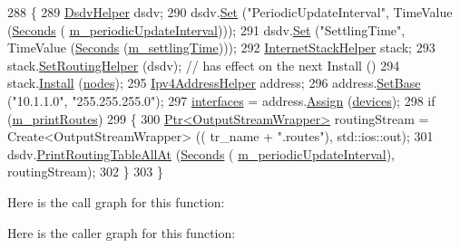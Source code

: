 \begin{DoxyCode}
288 \{
289   \hyperlink{classns3_1_1DsdvHelper}{DsdvHelper} dsdv;
290   dsdv.\hyperlink{classns3_1_1DsdvHelper_a782571eeded1e3e5978f4b430cd2bc2f}{Set} (\textcolor{stringliteral}{"PeriodicUpdateInterval"}, TimeValue (\hyperlink{group__timecivil_ga33c34b816f8ff6628e33d5c8e9713b9e}{Seconds} (
      \hyperlink{classDsdvManetExample_af850aea141a571eb01896a3b7f36d7d2}{m\_periodicUpdateInterval})));
291   dsdv.\hyperlink{classns3_1_1DsdvHelper_a782571eeded1e3e5978f4b430cd2bc2f}{Set} (\textcolor{stringliteral}{"SettlingTime"}, TimeValue (\hyperlink{group__timecivil_ga33c34b816f8ff6628e33d5c8e9713b9e}{Seconds} (\hyperlink{classDsdvManetExample_aaa43812d7f08d1d314ca3efdcc3d24e2}{m\_settlingTime})));
292   \hyperlink{classns3_1_1InternetStackHelper}{InternetStackHelper} stack;
293   stack.\hyperlink{classns3_1_1InternetStackHelper_a3e382c02df022dec79952a7eca8cd5ba}{SetRoutingHelper} (dsdv); \textcolor{comment}{// has effect on the next Install ()}
294   stack.\hyperlink{classns3_1_1InternetStackHelper_a6645b412f31283d2d9bc3d8a95cebbc0}{Install} (\hyperlink{classDsdvManetExample_a0d8c36ee21821999cc05443bb7efbb8f}{nodes});
295   \hyperlink{classns3_1_1Ipv4AddressHelper}{Ipv4AddressHelper} address;
296   address.\hyperlink{classns3_1_1Ipv4AddressHelper_acf7b16dd25bac67e00f5e25f90a9a035}{SetBase} (\textcolor{stringliteral}{"10.1.1.0"}, \textcolor{stringliteral}{"255.255.255.0"});
297   \hyperlink{classDsdvManetExample_aaae8652c3aa04761bb64671bcb493205}{interfaces} = address.\hyperlink{classns3_1_1Ipv4AddressHelper_af8e7f4a1a7e74c00014a1eac445a27af}{Assign} (\hyperlink{classDsdvManetExample_ad8353ca6796e0e793ee95bdedcc35193}{devices});
298   \textcolor{keywordflow}{if} (\hyperlink{classDsdvManetExample_a766aeb108aa6ff45ea6729fe875e89b3}{m\_printRoutes})
299     \{
300       \hyperlink{classns3_1_1Ptr}{Ptr<OutputStreamWrapper>} routingStream = Create<OutputStreamWrapper> ((
      tr\_name + \textcolor{stringliteral}{".routes"}), std::ios::out);
301       dsdv.\hyperlink{classns3_1_1Ipv4RoutingHelper_a10d8ba23eca330de968fdfbca2730ec3}{PrintRoutingTableAllAt} (\hyperlink{group__timecivil_ga33c34b816f8ff6628e33d5c8e9713b9e}{Seconds} (
      \hyperlink{classDsdvManetExample_af850aea141a571eb01896a3b7f36d7d2}{m\_periodicUpdateInterval}), routingStream);
302     \}
303 \}
\end{DoxyCode}


Here is the call graph for this function\+:




Here is the caller graph for this function\+:


